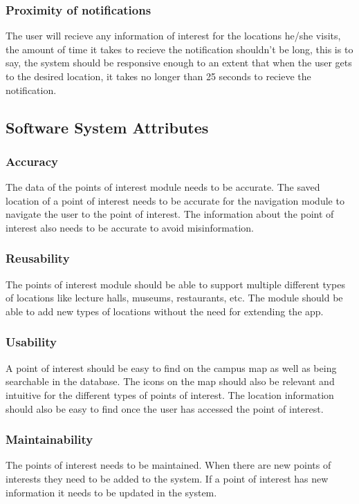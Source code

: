 \subsubsection{Proximity of notifications}
The user will recieve any information of interest for the locations he/she visits, the amount of time it takes to recieve the notification shouldn't be long, this is to say, the system should be responsive enough to an extent that when the user gets to the desired location, it takes no longer than 25 seconds to recieve the notification.
  	
\subsection{Software System Attributes}
    \subsubsection{Accuracy}
        The data of the points of interest module needs to be accurate. The saved location of a point of interest needs to be accurate for the navigation module to navigate the user to the point of interest. The information about the point of interest also needs to be accurate to avoid misinformation.
    \subsubsection{Reusability}
        The points of interest module should be able to support multiple different types of locations like lecture halls, museums, restaurants, etc. The module should be able to add new types of locations without the need for extending the app.
    \subsubsection{Usability}
        A point of interest should be easy to find on the campus map as well as being searchable in the database. The icons on the map should also be relevant and intuitive for the different types of points of interest. The location information should also be easy to find once the user has accessed the point of interest. 
    \subsubsection{Maintainability}
        The points of interest needs to be maintained. When there are new points of interests they need to be added to the system. If a point of interest has new information it needs to be updated in the system.

